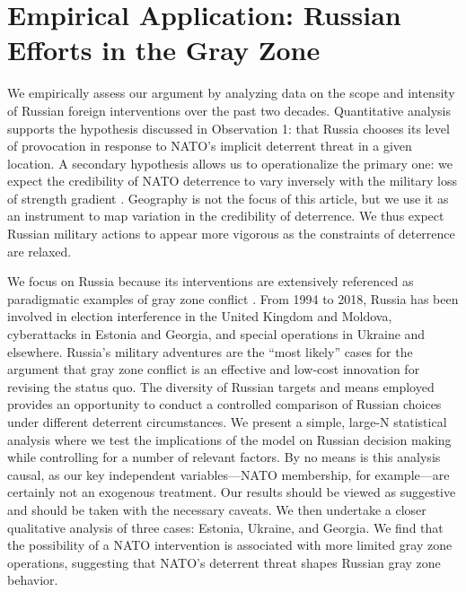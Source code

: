 \documentclass[bibtex, autowc]{apsr_submission}
\begin{document}
\section{Empirical Application: Russian Efforts in the Gray Zone}
We empirically assess our argument by analyzing data on the scope and intensity of Russian foreign interventions over the past two decades. Quantitative analysis supports the hypothesis discussed in Observation 1: that Russia chooses its level of provocation in response to NATO's implicit deterrent threat in a given location. A secondary hypothesis allows us to operationalize the primary one: we expect the credibility of NATO deterrence to vary inversely with the military loss of strength gradient \citep{boulding_conflictdefensegeneral_1962}. Geography is not the focus of this article, but we use it as an instrument to map variation in the credibility of deterrence. We thus expect Russian military actions to appear more vigorous as the constraints of deterrence are relaxed.

We focus on Russia because its interventions are extensively referenced as paradigmatic examples of gray zone conflict \citep{marten_putinchoicesexplaining_2015, driscoll_friendsthesebrinkmanship_2016, chivvis_hybridwarrussian_2017}. From 1994 to 2018, Russia has been involved in election interference in the United Kingdom and Moldova, cyberattacks in Estonia and Georgia, and special operations in Ukraine and elsewhere. Russia's military adventures are the ``most likely'' cases for the argument that gray zone conflict is an effective and low-cost innovation for revising the status quo. The diversity of Russian targets and means employed provides an opportunity to conduct a controlled comparison of Russian choices under different deterrent circumstances. We present a simple, large-N statistical analysis where we test the implications of the model on Russian decision making while controlling for a number of relevant factors. By no means is this analysis causal, as our key independent variables---NATO membership, for example---are certainly not an exogenous treatment. Our results should be viewed as suggestive and should be taken with the necessary caveats. We then undertake a closer qualitative analysis of three cases: Estonia, Ukraine, and Georgia. We find that the possibility of a NATO intervention is associated with more limited gray zone operations, suggesting that NATO's deterrent threat shapes Russian gray zone behavior.
\end{document}
